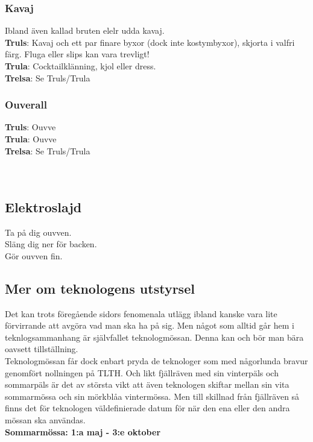 \subsubsection*{Kavaj}
Ibland även kallad bruten elelr udda kavaj.\\
\textbf{Truls}: Kavaj och ett par finare byxor (dock inte kostymbyxor), skjorta i valfri färg. Fluga eller slips kan vara trevligt!\\
\textbf{Trula}: Cocktailklänning, kjol eller dress.\\
\textbf{Trelsa}: Se Truls/Trula

\subsubsection*{Ouverall}
\textbf{Truls}: Ouvve\\
\textbf{Trula}: Ouvve\\
\textbf{Trelsa}: Se Truls/Trula
\\
\\
\\
\subsection*{Elektroslajd}
Ta på dig ouvven.\\
Släng dig ner för backen.\\
Gör ouvven fin.

\newpage

\subsection*{Mer om teknologens utstyrsel}
Det kan trots föregående sidors fenomenala utlägg ibland kanske vara lite förvirrande att avgöra vad man ska ha på sig.
Men något som alltid går hem i teknlogsammanhang är självfallet teknologmössan. 
Denna kan och bör man bära oavsett tillställning.
\\


Teknologmössan får dock enbart pryda de teknologer som med någorlunda bravur genomfört nollningen på TLTH.
Och likt fjällräven med sin vinterpäls och sommarpäls är det av största vikt att även teknologen skiftar mellan sin vita sommarmössa och sin mörkblåa vintermössa.
Men till skillnad från fjällräven så finns det för teknologen väldefinierade datum för när den ena eller den andra mössan ska användas.
\\


\textbf{Sommarmössa: 1:a maj - 3:e oktober}


